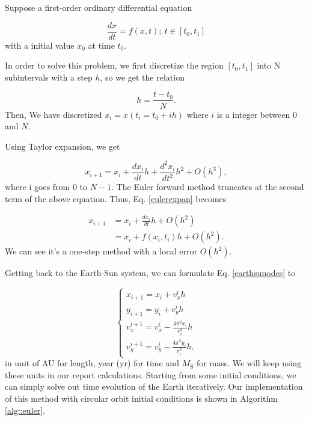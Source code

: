 Suppose a first-order ordinary differential equation

\begin{equation}
	\frac{dx}{dt} = f(x,t);\ t\in[t_0,t_1]
\end{equation}
with a initial value $x_0$ at time $t_0$. 

In order to solve this problem, we first discretize the region $ [t_0,t_1]$ into N subintervals with a step $h$, so we get the relation

\begin{equation}
	h=\frac{t-t_0}{N}.
\end{equation}
Then, We have discretized $x_i=x(t_i=t_0+ih)$ where $i$ is a integer between 0 and $N$.

Using Taylor expansion, we get 

\begin{equation}
	\label{eulerexpan}
	x_{i+1} = x_i + \frac{dx_i}{dt}h + \frac{d^2x_i}{dt^2}h^2 + O(h^3),
\end{equation}
where i goes from 0 to $N-1$.
The Euler forward method truncates at the second term of the above equation.
Thus, Eq. \ref{eulerexpan} becomes

\begin{equation}
	\begin{aligned}
		x_{i+1} & = x_i + \frac{dx_i}{dt}h + O(h^2) \\ 
				& = x_i + f(x_i,t_i)h + O(h^2).
	\end{aligned}
\end{equation}
We can see it's a one-step method with a local error $O(h^2)$.

Getting back to the Earth-Sun system, we can formulate Eq. \ref{earthsunodes} to

\begin{equation}
	\left\{  
             \begin{array}{lr}  
             	x_{i+1} = x_i + v_x^{i}h \\
				y_{i+1} = y_i + v_y^{i}h \\
             	v_x^{i+1} = v_x^{i} - \frac{4\pi^2x_i}{r_i^3}h\\
             	v_y^{i+1} = v_y^{i} - \frac{4\pi^2y_i}{r_i^3}h.
			\end{array}  
	\right.	
\end{equation} 
in unit of AU for length, year (yr) for time and $M_{\mathrm{S}}$ for mass. 
We will keep using these units in our report calculations. 
Starting from some initial conditions, we can simply solve out time evolution of the Earth iteratively. 
Our implementation of this method with circular orbit initial conditions is shown in Algorithm \ref{alg::euler}. 

